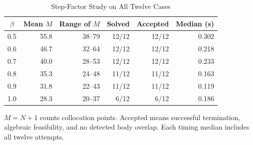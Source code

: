 \begin{table}[t]
\caption{Step-Factor Study on All Twelve Cases}\label{tab:beta}
\centering\footnotesize
\begin{tabular}{@{}crrrrr@{}}\toprule
$\beta$&Mean $M$&Range of $M$&Solved&Accepted&Median (s)\\\midrule
0.5&55.8&38--79&12/12&12/12&0.302\\
0.6&46.7&32--64&12/12&12/12&0.218\\
0.7&40.0&28--53&12/12&12/12&0.233\\
0.8&35.3&24--48&11/12&11/12&0.163\\
0.9&31.8&22--43&11/12&11/12&0.119\\
1.0&28.3&20--37&6/12&6/12&0.186\\
\bottomrule\end{tabular}
\par\smallskip\parbox{\columnwidth}{\footnotesize $M=N+1$ counts collocation points. Accepted means successful termination, algebraic feasibility, and no detected body overlap. Each timing median includes all twelve attempts.}
\end{table}
